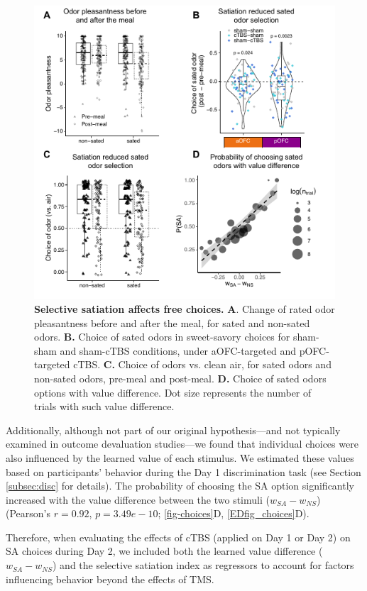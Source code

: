 \documentclass[lineno,sn-basic]{sn-jnl}%
\begin{document}
\begin{figure}
\centering
\includegraphics[width=0.85\linewidth]{Fig_choices.pdf}
\caption{\textbf{Selective satiation affects free choices.} 
\textbf{A}. Change of rated odor pleasantness before and after the meal, for sated and non-sated odors. 
\textbf{B.} Choice of sated odors in sweet-savory choices for sham-sham and sham-cTBS conditions, under aOFC-targeted and pOFC-targeted cTBS. 
\textbf{C.} Choice of odors vs. clean air, for sated odors and non-sated odors, pre-meal and post-meal. 
\textbf{D.} Choice of sated odors options with value difference. Dot size represents the number of trials with such value difference. 
}
\label{fig-choices}
\end{figure}


Additionally, although not part of our original hypothesis—and not typically examined in outcome devaluation studies—we found that individual choices were also influenced by the learned value of each stimulus. We estimated these values based on participants' behavior during the Day 1 discrimination task (see Section \ref{subsec:disc} for details). The probability of choosing the SA option significantly increased with the value difference between the two stimuli ($w_{SA}-w_{NS}$)  (Pearson's $r = 0.92$, $p = 3.49e-10$; \autoref{fig-choices}D, \ref{EDfig_choices}D).

Therefore, when evaluating the effects of cTBS (applied on Day 1 or Day 2) on SA choices during Day 2, we included both the learned value difference ($w_{SA}-w_{NS}$) and the selective satiation index as regressors to account for factors influencing behavior beyond the effects of TMS. 
\end{document}
